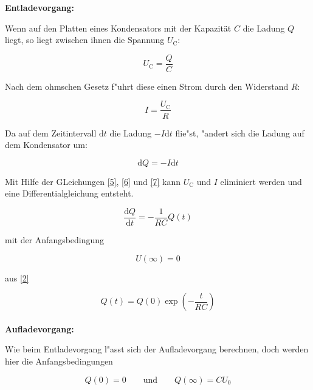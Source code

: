 \documentclass{scrartcl}
\begin{document}
				\textbf{Entladevorgang:}

				Wenn auf den Platten eines Kondensators mit der Kapazität $C$ die Ladung $Q$ liegt, so liegt zwischen ihnen die Spannung $U_\mathrm{C}$:

				\begin{equation}
					U_\mathrm{C} = \frac{Q}{C} \label{5}
				\end{equation}

				Nach dem ohmschen Gesetz f"uhrt diese einen Strom durch den Widerstand $R$:

				\begin{equation}
					I = \frac{U_\mathrm{C}}{R} \label{6}
				\end{equation}

				Da auf dem Zeitintervall $\mathrm{d}t$ die Ladung $-I \mathrm{d} t$ flie"st, "andert sich die Ladung auf dem Kondensator um: 

				\begin{equation}
					\mathrm{d} Q = -I\mathrm{d}t \label{7}
				\end{equation}

				Mit Hilfe der GLeichungen \ref{5}, \ref{6} und \ref{7} kann $U_\mathrm{C}$ und $I$ eliminiert werden und eine Differentialgleichung entsteht.

				\begin{equation}
					\frac{\mathrm{d}Q}{\mathrm{d}t} = -\frac{1}{RC}Q(t) \label{8}
				\end{equation}

				mit der Anfangsbedingung

				\begin{equation}
					U(\infty) = 0 \label{9}
				\end{equation}

				\Rightarrow	aus \ref{2}

				\begin{equation}
					 Q(t) = Q(0) \exp{ \left( -\frac{t}{RC} \right) } \label{9}
				\end{equation}\\[0.5cm]

				
				\textbf{Aufladevorgang:}

				Wie beim Entladevorgang l"asst sich der Aufladevorgang berechnen, doch werden hier die Anfangsbedingungen

				\begin{equation}
					Q(0) = 0 \qquad \mathrm{und} \qquad Q(\infty) = C U_\mathrm{0} \label{10}
				\end{equation}
\end{document}
